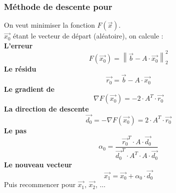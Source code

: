 \subsubsection*{Méthode de descente pour }
\noindent
On veut minimiser la fonction $F(\overrightarrow{x})$.\\
$\overrightarrow{x_0}$ étant le vecteur de départ (aléatoire), on calcule :\\
\textbf{L'erreur}
\begin{equation}
    F(\overrightarrow{x_0})=\left \| \overrightarrow{b}-A\cdot \overrightarrow{x_0} \right \|_2^2
    \nonumber
\end{equation}
\textbf{Le résidu}
\begin{equation}
    \overrightarrow{r_0}=\overrightarrow{b}-A\cdot \overrightarrow{x_0}
    \nonumber
\end{equation}
\textbf{Le gradient de }
\begin{equation}
    \nabla F(\overrightarrow{x_0})=-2\cdot A^T\cdot \overrightarrow{r_0}
    \nonumber
\end{equation}
\textbf{La direction de descente}
\begin{equation}
    \overrightarrow{d_0}=-\nabla F(\overrightarrow{x_0})=2\cdot A^T\cdot \overrightarrow{r_0}
    \nonumber
\end{equation}
\textbf{Le pas}
\begin{equation}
    \alpha_0=\frac{\overrightarrow{r_0}^T\cdot A\cdot \overrightarrow{d_0}}{\overrightarrow{d_0}^T\cdot A^T\cdot A\cdot \overrightarrow{d_0}}
    \nonumber
\end{equation}
\textbf{Le nouveau vecteur}
\begin{equation}
    \overrightarrow{x_1}=\overrightarrow{x_0}+\alpha_0\cdot \overrightarrow{d_0}
    \nonumber
\end{equation}
Puis recommencer pour $\overrightarrow{x_1}$, $\overrightarrow{x_2}$, $\dots$\\

